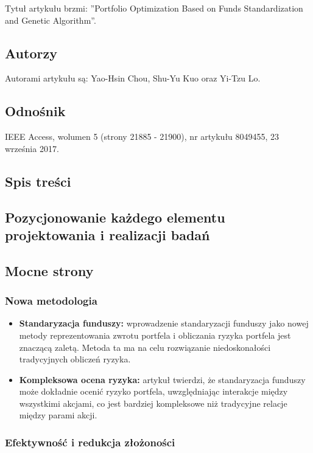 \documentclass[polish,envcountsect,10pt]{article}
\begin{document}
Tytuł artykułu brzmi: ''Portfolio Optimization Based on Funds Standardization and Genetic Algorithm''.

\subsection{Autorzy}

Autorami artykułu są: Yao-Hsin Chou, Shu-Yu Kuo oraz Yi-Tzu Lo.

\subsection{Odnośnik}

IEEE Access, wolumen 5 (strony 21885 - 21900), nr artykułu 8049455, 23 września 2017.

\subsection{Spis treści}


\subsection{Pozycjonowanie każdego elementu projektowania i realizacji badań}


\subsection{Mocne strony}

\subsubsection{Nowa metodologia}

\begin{itemize}
	\item \textbf{Standaryzacja funduszy:}
    wprowadzenie standaryzacji funduszy jako nowej metody reprezentowania zwrotu portfela i obliczania ryzyka portfela jest znaczącą zaletą. Metoda ta ma na celu rozwiązanie niedoskonałości tradycyjnych obliczeń ryzyka.
	\item \textbf{Kompleksowa ocena ryzyka:}
    artykuł twierdzi, że standaryzacja funduszy może dokładnie ocenić ryzyko portfela, uwzględniając interakcje między wszystkimi akcjami, co jest bardziej kompleksowe niż tradycyjne relacje między parami akcji.
\end{itemize}

\subsubsection{Efektywność i redukcja złożoności}
\end{document}
